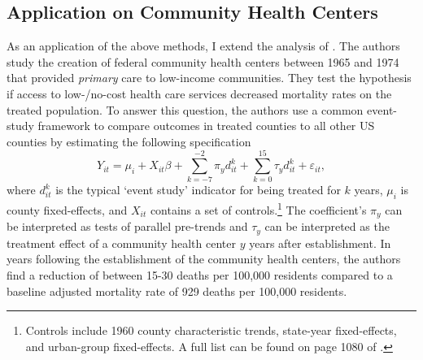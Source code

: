 \subsection{Application on Community Health Centers}\label{sec:chc}

As an application of the above methods, I extend the analysis of \citet{Bailey_Goodman_Bacon_2015}. The authors study the creation of federal community health centers between 1965 and 1974 that provided \textit{primary} care to low-income communities. They test the hypothesis if access to low-/no-cost health care services decreased mortality rates on the treated population. To answer this question, the authors use a common event-study framework to compare outcomes in treated counties to all other US counties by estimating the following specification 
\begin{equation}\label{eq:chc_es}
  Y_{it} = \mu_i + X_{it} \beta + \sum_{k = -7}^{-2} \pi_y d_{it}^k + \sum_{k = 0}^{15} \tau_{y} d_{it}^k + \varepsilon_{it},
\end{equation}
where $d_{it}^k$ is the typical `event study' indicator for being treated for $k$ years, $\mu_i$ is county fixed-effects, and $X_{it}$ contains a set of controls.\footnote{Controls include 1960 county characteristic trends, state-year fixed-effects, and urban-group fixed-effects. A full list can be found on page 1080 of \citet{Bailey_Goodman_Bacon_2015}.} The coefficient's $\pi_y$ can be interpreted as tests of parallel pre-trends and $\tau_y$ can be interpreted as the treatment effect of a community health center $y$ years after establishment. In years following the establishment of the community health centers, the authors find a reduction of between 15-30 deaths per 100,000 residents compared to a baseline adjusted mortality rate of 929 deaths per 100,000 residents. 

